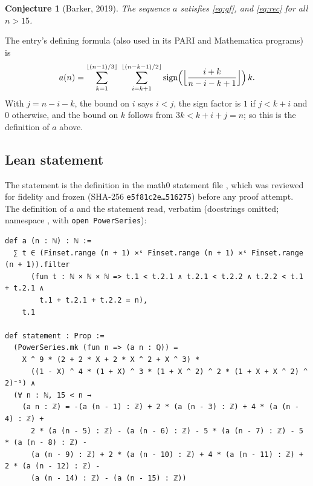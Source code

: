 \documentclass[11pt]{amsart}
\theoremstyle{plain}
\newtheorem{conjecture}[theorem]{Conjecture}
\theoremstyle{definition}
\begin{document}
\begin{conjecture}[Barker, 2019]\label{conj}
The sequence $a$ satisfies \eqref{eq:gf}, and \eqref{eq:rec} for all $n>15$.
\end{conjecture}

The entry's defining formula (also used in its PARI and Mathematica programs) is
\[
  a(n)=\sum_{k=1}^{\lfloor(n-1)/3\rfloor}\ \sum_{i=k+1}^{\lfloor(n-k-1)/2\rfloor}\operatorname{sign}\Bigl(\Bigl\lfloor\frac{i+k}{n-i-k+1}\Bigr\rfloor\Bigr)\,k .
\]
With $j=n-i-k$, the bound on $i$ says $i<j$, the sign factor is $1$ if $j<k+i$ and $0$ otherwise, and the bound on $k$ follows from $3k<k+i+j=n$; so this is the definition of $a$ above.

\subsection*{Lean statement}
The statement is the definition  in the math0 statement file , which was reviewed for fidelity and frozen (SHA-256 \texttt{e5f81c2e\ldots 516275}) before any proof attempt.
The definition of $a$ and the statement read, verbatim (docstrings omitted; namespace , with \texttt{open PowerSeries}):
\begin{lstlisting}
def a (n : ℕ) : ℕ :=
  ∑ t ∈ (Finset.range (n + 1) ×ˢ Finset.range (n + 1) ×ˢ Finset.range (n + 1)).filter
      (fun t : ℕ × ℕ × ℕ => t.1 < t.2.1 ∧ t.2.1 < t.2.2 ∧ t.2.2 < t.1 + t.2.1 ∧
        t.1 + t.2.1 + t.2.2 = n),
    t.1

def statement : Prop :=
  (PowerSeries.mk (fun n => (a n : ℚ)) =
    X ^ 9 * (2 + 2 * X + 2 * X ^ 2 + X ^ 3) *
      ((1 - X) ^ 4 * (1 + X) ^ 3 * (1 + X ^ 2) ^ 2 * (1 + X + X ^ 2) ^ 2)⁻¹) ∧
  (∀ n : ℕ, 15 < n →
    (a n : ℤ) = -(a (n - 1) : ℤ) + 2 * (a (n - 3) : ℤ) + 4 * (a (n - 4) : ℤ) +
      2 * (a (n - 5) : ℤ) - (a (n - 6) : ℤ) - 5 * (a (n - 7) : ℤ) - 5 * (a (n - 8) : ℤ) -
      (a (n - 9) : ℤ) + 2 * (a (n - 10) : ℤ) + 4 * (a (n - 11) : ℤ) + 2 * (a (n - 12) : ℤ) -
      (a (n - 14) : ℤ) - (a (n - 15) : ℤ))
\end{lstlisting}
\end{document}
